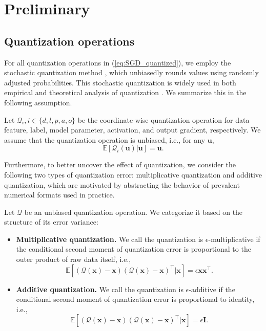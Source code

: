 \documentclass[11pt, letterpaper]{article}
\begin{document}
\section{Preliminary}

\subsection{Quantization operations} 
For all quantization operations in  (\ref{eq:SGD_quantized}), we employ the stochastic quantization method \citep{markov2023quantized}, which unbiasedly rounds values using randomly adjusted probabilities. This stochastic quantization is widely used in both empirical and theoretical analysis of quantization \citep{modoranu2024microadam,ozkara2025stochastic}.
We summarize this in the following assumption.
\begin{assumption}
    \label{ass1}
    Let $\mathcal Q_i, i\in \{d,l,p,a,o\}$ be the coordinate-wise quantization operation for data feature, label, model parameter, activation, and output gradient, respectively. We assume that the quantization operation is unbiased, i.e., for any $\mathbf{u}$,
    \begin{equation*}
        \mathbb{E}\left[\mathbf{\mathcal{Q}}_i(\mathbf{u})|\mathbf{u}\right]=\mathbf{u}.
    \end{equation*}
\end{assumption}

Furthermore, to better uncover the effect of quantization, we consider the following two types of quantization error: multiplicative quantization and additive quantization, which are motivated by abstracting the behavior of prevalent numerical formats used in practice.
\begin{definition}\label{def:type_quantization}
Let $\mathcal{Q}$ be an unbiased quantization operation. We categorize it based on the structure of its error variance:
\begin{itemize}[leftmargin=*,nosep]
\item \textbf{Multiplicative quantization.} We call the quantization is $\epsilon$-multiplicative if the conditional second moment of quantization error is proportional to the outer product of raw data itself, i.e.,
    \begin{equation*}
        \mathbb{E}\left[\left(\mathcal{Q}(\mathbf{x})-\mathbf{x}\right)\left(\mathcal{Q}(\mathbf{x})-\mathbf{x}\right)^\top\bigg|\mathbf{x}\right]=\epsilon \mathbf{x}\mathbf{x}^\top.
    \end{equation*}
\item \textbf{Additive quantization.} We call the quantization is $\epsilon$-additive if the conditional second moment of quantization error is proportional to identity, i.e.,
    \begin{equation*}
        \mathbb{E}\left[\left(\mathcal{Q}(\mathbf{x})-\mathbf{x}\right)\left(\mathcal{Q}(\mathbf{x})-\mathbf{x}\right)^\top\bigg|\mathbf{x}\right]=\epsilon \mathbf{I}.
    \end{equation*}
\end{itemize}
\end{definition}
\end{document}
